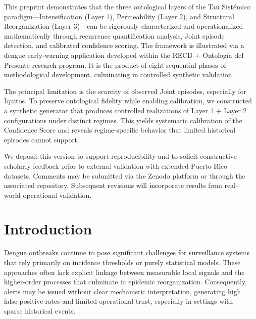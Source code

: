 \documentclass[11pt,a4paper]{article}
\begin{document}
\begin{zenodolletter}
This preprint demonstrates that the three ontological layers of the Tau Sistémico paradigm---Intensification (Layer 1), Permeability (Layer 2), and Structural Reorganization (Layer 3)---can be rigorously characterized and operationalized mathematically through recurrence quantification analysis, Joint episode detection, and calibrated confidence scoring. The framework is illustrated via a dengue early-warning application developed within the RECD + Ontología del Presente research program. It is the product of eight sequential phases of methodological development, culminating in controlled synthetic validation.

The principal limitation is the scarcity of observed Joint episodes, especially for Iquitos. To preserve ontological fidelity while enabling calibration, we constructed a synthetic generator that produces controlled realizations of Layer 1 + Layer 2 configurations under distinct regimes. This yields systematic calibration of the Confidence Score and reveals regime-specific behavior that limited historical episodes cannot support.

We deposit this version to support reproducibility and to solicit constructive scholarly feedback prior to external validation with extended Puerto Rico datasets. Comments may be submitted via the Zenodo platform or through the associated repository. Subsequent revisions will incorporate results from real-world operational validation.
\end{zenodolletter}

\vspace{0.5em}

\section{Introduction}

Dengue outbreaks continue to pose significant challenges for surveillance systems that rely primarily on incidence thresholds or purely statistical models. These approaches often lack explicit linkage between measurable local signals and the higher-order processes that culminate in epidemic reorganization. Consequently, alerts may be issued without clear mechanistic interpretation, generating high false-positive rates and limited operational trust, especially in settings with sparse historical events.
\end{document}
